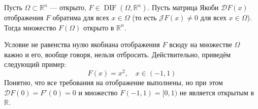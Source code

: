\documentclass[11pt]{article}
\DeclareMathOperator{\DIF}{DIF}
\begin{document}
\begin{theorem}
    Пусть $\Omega \subset \mathbb{R}^n$ --- открыто, $F \in \DIF (\Omega, \mathbb{R}^n)$. Пусть матрица Якоби $\mathcal{D} F (x)$ отображения $F$ обратима 
    для всех $x \in \Omega$ (то есть $\mathcal{J} F(x) \neq 0$ для всех $x \in \Omega$). Тогда множество $F(\Omega)$ открыто в $\mathbb{R}^n$.
\end{theorem}

\begin{remark}
    Условие не равенства нулю якобиана отображения $F$ всюду на множестве $\Omega$ важно и его, вообще говоря, нельзя отбросить.
    Действительно, приведём следующий пример:
    \[F(x) = x^2, \quad x \in (-1, 1)\]
    Понятно, что все требования на отображение выполнены, но при этом $\mathcal{D} F (0) = F'(0) = 0$ и множество $F(-1, 1) = [0, 1)$ не является открытым в $\mathbb{R}$.
\end{remark}
\end{document}
